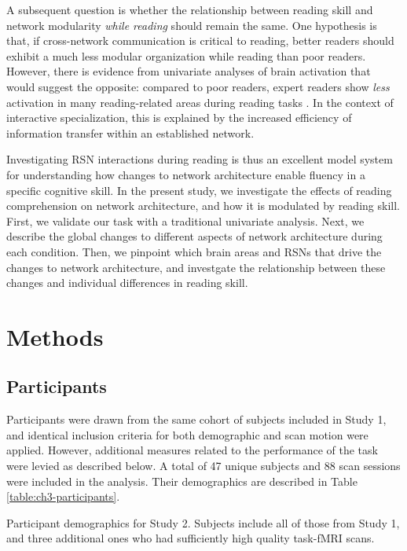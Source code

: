 A subsequent question is whether the relationship between reading skill and network modularity \textit{while reading} should remain the same. One hypothesis is that, if cross-network communication is critical to reading, better readers should exhibit a much less modular organization while reading than poor readers. However, there is evidence from univariate analyses of brain activation that would suggest the opposite: compared to poor readers, expert readers show \textit{less} activation in many reading-related areas during reading tasks \citep{Christodoulou2014}.  In the context of interactive specialization, this is explained by the increased efficiency of information transfer within an established network. 

Investigating RSN interactions during reading is thus an excellent model system for understanding how changes to network architecture enable fluency in a specific cognitive skill. In the present study, we investigate the effects of reading comprehension on network architecture, and how it is modulated by reading skill. First, we validate our task with a traditional univariate analysis. Next, we describe the global changes to different aspects of network architecture during each condition. Then, we pinpoint which brain areas and RSNs that drive the changes to network architecture, and investgate the relationship between these changes and individual differences in reading skill. 


\section{Methods}

\subsection{Participants}

Participants were drawn from the same cohort of subjects included in Study 1, and identical inclusion criteria for both demographic and scan motion were applied. However, additional measures related to the performance of the task were levied as described below. A total of 47 unique subjects and 88 scan sessions were included in the analysis. Their demographics are described in Table \ref{table:ch3-participants}.

\begin{table}
	\renewcommand{\tabcolsep}{0.09cm}
	\centering
	
	\caption[Participant demographics for Study 2.]{Participant demographics for Study 2. Subjects include all of those from Study 1, and three additional ones who had sufficiently high quality task-fMRI scans.}
	\label{table:ch3-participants}
\end{table}


